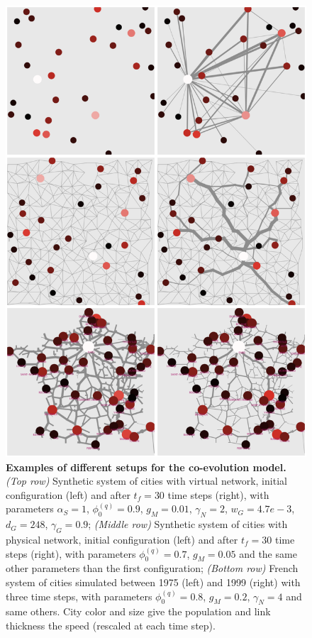 \documentclass[11pt]{article}
\begin{document}
\begin{figure}
	\includegraphics[width=0.95\linewidth]{Fig1.png}
	\caption{\footnotesize\textbf{Examples of different setups for the co-evolution model.} \textit{(Top row)} Synthetic system of cities with virtual network, initial configuration (left) and after $t_f=30$ time steps (right), with parameters $\alpha_S = 1$, $\phi^{(q)}_0 = 0.9$, $g_M = 0.01$, $\gamma_N=2$, $w_G=4.7e-3$, $d_G=248$, $\gamma_G=0.9$; \textit{(Middle row)} Synthetic system of cities with physical network, initial configuration (left) and after $t_f=30$ time steps (right), with parameters $\phi^{(q)}_0 = 0.7$, $g_M = 0.05$ and the same other parameters than the first configuration; \textit{(Bottom row)} French system of cities simulated between 1975 (left) and 1999 (right) with three time steps, with parameters $\phi^{(q)}_0 = 0.8$, $g_M = 0.2$, $\gamma_N=4$ and same others. City color and size give the population and link thickness the speed (rescaled at each time step).\label{fig:examples}}
\end{figure}
\end{document}
